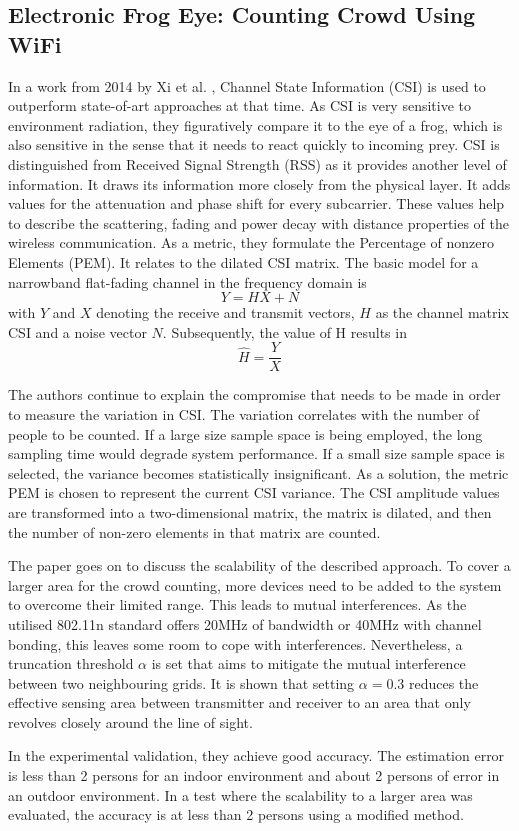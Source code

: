 \documentclass[conference]{IEEEtran}
\begin{document}
\subsection{Electronic Frog Eye: Counting Crowd Using WiFi}
In a work from 2014 by Xi et al. \cite{Xi}, Channel State Information (CSI) is used to outperform state-of-art approaches at that time. As CSI is very sensitive to environment radiation, they figuratively compare it to the eye of a frog, which is also sensitive in the sense that it needs to react quickly to incoming prey. CSI is distinguished from Received Signal Strength (RSS) as it provides another level of information. It draws its information more closely from the physical layer. It adds values for the attenuation and phase shift for every subcarrier. These values help to describe the scattering, fading and power decay with distance properties of the wireless communication. As a metric, they formulate the Percentage of nonzero Elements (PEM). It relates to the dilated CSI matrix. The basic model for a narrowband flat-fading channel in the frequency domain is
$$ Y = HX + N $$
with $Y$ and $X$ denoting the receive and transmit vectors, $H$ as the channel matrix CSI and a noise vector $N$. Subsequently, the value of H results in 
$$ \widehat{H} = \frac{Y}{X} $$
\par
The authors continue to explain the compromise that needs to be made in order to measure the variation in CSI. The variation correlates with the number of people to be counted. If a large size sample space is being employed, the long sampling time would degrade system performance. If a small size sample space is selected, the variance becomes statistically insignificant. As a solution, the metric PEM is chosen to represent the current CSI variance. The CSI amplitude values are transformed into a two-dimensional matrix, the matrix is dilated, and then the number of non-zero elements in that matrix are counted.
\par
The paper goes on to discuss the scalability of the described approach. To cover a larger area for the crowd counting, more devices need to be added to the system to overcome their limited range. This leads to mutual interferences. As the utilised 802.11n standard offers 20MHz of bandwidth or 40MHz with channel bonding, this leaves some room to cope with interferences. Nevertheless, a truncation threshold $\alpha$ is set that aims to mitigate the mutual interference between two neighbouring grids. It is shown that setting $\alpha = 0.3$ reduces the effective sensing area between transmitter and receiver to an area that only revolves closely around the line of sight.
\par
In the experimental validation, they achieve good accuracy. The estimation error is less than 2 persons for an indoor environment and about 2 persons of error in an outdoor environment. In a test where the scalability to a larger area was evaluated, the accuracy is at less than 2 persons using a modified method.
\end{document}
